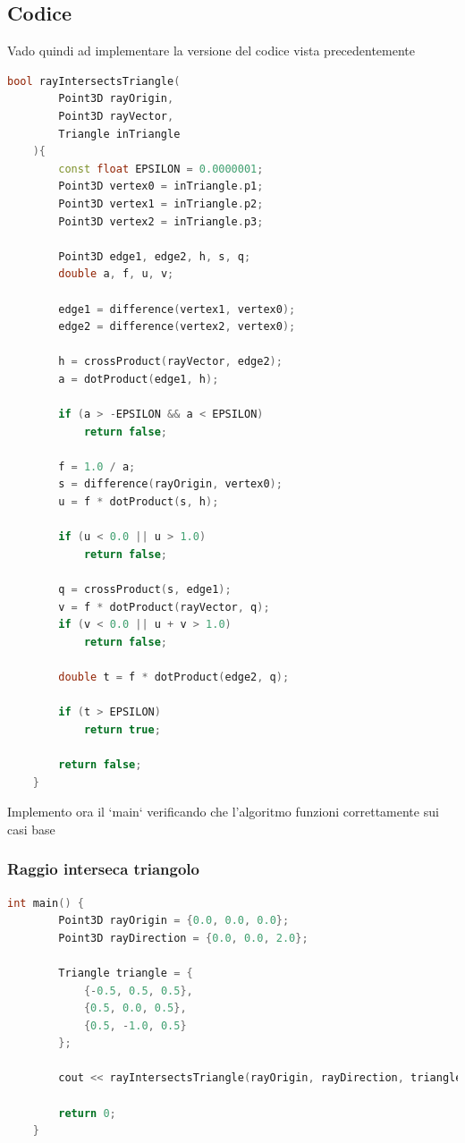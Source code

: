 \documentclass[a4paper]{article}
\begin{document}
\newpage

\subsection{Codice}
Vado quindi ad implementare la versione del codice vista precedentemente

\begin{lstlisting}[language=c++]
    bool rayIntersectsTriangle(
        Point3D rayOrigin, 
        Point3D rayVector,
        Triangle inTriangle
    ){
        const float EPSILON = 0.0000001;
        Point3D vertex0 = inTriangle.p1;
        Point3D vertex1 = inTriangle.p2;
        Point3D vertex2 = inTriangle.p3;

        Point3D edge1, edge2, h, s, q;
        double a, f, u, v;

        edge1 = difference(vertex1, vertex0);
        edge2 = difference(vertex2, vertex0);

        h = crossProduct(rayVector, edge2);
        a = dotProduct(edge1, h);

        if (a > -EPSILON && a < EPSILON)
            return false;

        f = 1.0 / a;
        s = difference(rayOrigin, vertex0);
        u = f * dotProduct(s, h);

        if (u < 0.0 || u > 1.0)
            return false;

        q = crossProduct(s, edge1);
        v = f * dotProduct(rayVector, q);
        if (v < 0.0 || u + v > 1.0)
            return false;

        double t = f * dotProduct(edge2, q);

        if (t > EPSILON)
            return true;

        return false;
    }
\end{lstlisting}

\newpage

Implemento ora il `main` verificando che l'algoritmo funzioni correttamente sui casi base

\subsubsection{Raggio interseca triangolo}

\begin{lstlisting}[language=c++]
    int main() {
        Point3D rayOrigin = {0.0, 0.0, 0.0};
        Point3D rayDirection = {0.0, 0.0, 2.0};
        
        Triangle triangle = {
            {-0.5, 0.5, 0.5}, 
            {0.5, 0.0, 0.5}, 
            {0.5, -1.0, 0.5}
        };
        
        cout << rayIntersectsTriangle(rayOrigin, rayDirection, triangle);

        return 0;
    }
\end{lstlisting}
\end{document}
